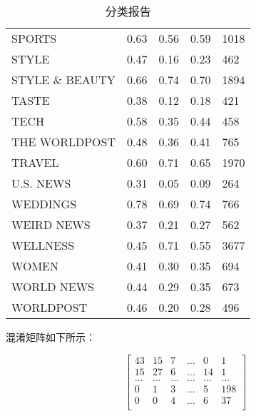 \documentclass{article}
\begin{document}
\begin{table}[h]
\begin{tabular}{|l|l|l|l|l|}
    SPORTS & 0.63 & 0.56 & 0.59 & 1018 \\
    STYLE & 0.47 & 0.16 & 0.23 & 462 \\
    STYLE \& BEAUTY & 0.66 & 0.74 & 0.70 & 1894 \\
    TASTE & 0.38 & 0.12 & 0.18 & 421 \\
    TECH & 0.58 & 0.35 & 0.44 & 458 \\
    THE WORLDPOST & 0.48 & 0.36 & 0.41 & 765 \\
    TRAVEL & 0.60 & 0.71 & 0.65 & 1970 \\
    U.S. NEWS & 0.31 & 0.05 & 0.09 & 264 \\
    WEDDINGS & 0.78 & 0.69 & 0.74 & 766 \\
    WEIRD NEWS & 0.37 & 0.21 & 0.27 & 562 \\
    WELLNESS & 0.45 & 0.71 & 0.55 & 3677 \\
    WOMEN & 0.41 & 0.30 & 0.35 & 694 \\
    WORLD NEWS & 0.44 & 0.29 & 0.35 & 673 \\
    WORLDPOST & 0.46 & 0.20 & 0.28 & 496 \\
    \hline
    \end{tabular}
    \caption{分类报告}
\end{table}



混淆矩阵如下所示：

\[
\begin{bmatrix}
    43 & 15 & 7 & \ldots & 0 & 1 \\
    15 & 27 & 6 & \ldots & 14 & 1 \\
    \ldots & \ldots & \ldots & \ldots & \ldots & \ldots \\
    0 & 1 & 3 & \ldots & 5 & 198 \\
    0 & 0 & 4 & \ldots & 6 & 37 \\
\end{bmatrix}
\]
\end{document}
